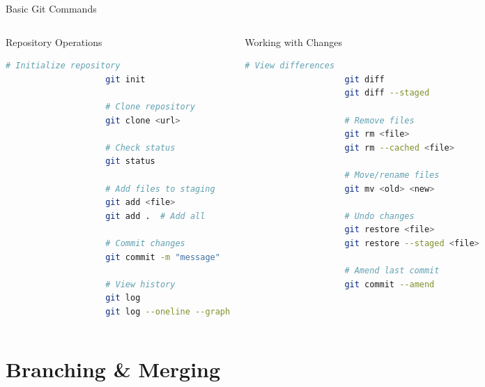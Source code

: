 \documentclass[aspectratio=169]{beamer}
\begin{document}
	\begin{frame}[fragile]{Basic Git Commands}
		\begin{columns}[T]
			\begin{block}{Repository Operations}
				\begin{lstlisting}[language=bash]
					# Initialize repository
					git init
					
					# Clone repository
					git clone <url>
					
					# Check status
					git status
					
					# Add files to staging
					git add <file>
					git add .  # Add all
					
					# Commit changes
					git commit -m "message"
					
					# View history
					git log
					git log --oneline --graph
				\end{lstlisting}
			\end{block}
			
			\begin{block}{Working with Changes}
				\begin{lstlisting}[language=bash]
					# View differences
					git diff
					git diff --staged
					
					# Remove files
					git rm <file>
					git rm --cached <file>
					
					# Move/rename files
					git mv <old> <new>
					
					# Undo changes
					git restore <file>
					git restore --staged <file>
					
					# Amend last commit
					git commit --amend
				\end{lstlisting}
			\end{block}
		\end{columns}
	\end{frame}
	
	\section{Branching \& Merging}
	
\end{document}
